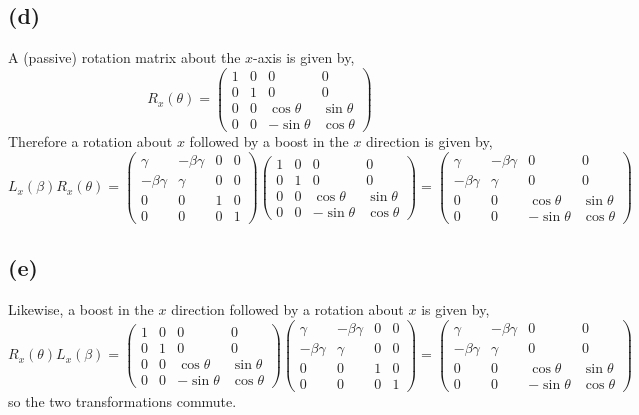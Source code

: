\documentclass[11pt]{amsart}
\begin{document}
\subsection*{(d)}
A (passive) rotation matrix about the $x$-axis is given by,
\[R_x(\theta) = \begin{pmatrix}
1 & 0 & 0 & 0 \\
0 & 1 & 0 & 0 \\
0 & 0 & \cos{\theta} & \sin{\theta} \\
0 & 0 & -\sin{\theta} & \cos{\theta} 
\end{pmatrix}\]
Therefore a rotation about $x$ followed by a boost in the $x$ direction is given by,
\[ L_x(\beta) R_x(\theta) = \begin{pmatrix}
\gamma & - \beta \gamma & 0 & 0 \\
- \beta \gamma & \gamma & 0 & 0 \\
0 & 0 & 1 & 0 \\
0 & 0 & 0 & 1
\end{pmatrix}
\begin{pmatrix}
1 & 0 & 0 & 0 \\
0 & 1 & 0 & 0 \\
0 & 0 & \cos{\theta} & \sin{\theta} \\
0 & 0 & -\sin{\theta} & \cos{\theta} 
\end{pmatrix} = 
\begin{pmatrix}
\gamma & - \beta \gamma & 0 & 0 \\
- \beta \gamma & \gamma & 0 & 0 \\
0 & 0 & \cos{\theta} & \sin{\theta} \\
0 & 0 & -\sin{\theta} & \cos{\theta} 
\end{pmatrix}
\]
\subsection*{(e)}
Likewise, a boost in the $x$ direction followed by a rotation about $x$ is given by,
\[ R_x(\theta) L_x(\beta) = 
\begin{pmatrix}
1 & 0 & 0 & 0 \\
0 & 1 & 0 & 0 \\
0 & 0 & \cos{\theta} & \sin{\theta} \\
0 & 0 & -\sin{\theta} & \cos{\theta} 
\end{pmatrix}
\begin{pmatrix}
\gamma & - \beta \gamma & 0 & 0 \\
- \beta \gamma & \gamma & 0 & 0 \\
0 & 0 & 1 & 0 \\
0 & 0 & 0 & 1
\end{pmatrix} = 
\begin{pmatrix}
\gamma & - \beta \gamma & 0 & 0 \\
- \beta \gamma & \gamma & 0 & 0 \\
0 & 0 & \cos{\theta} & \sin{\theta} \\
0 & 0 & -\sin{\theta} & \cos{\theta} 
\end{pmatrix}
\]
so the two transformations commute. 
\end{document}
